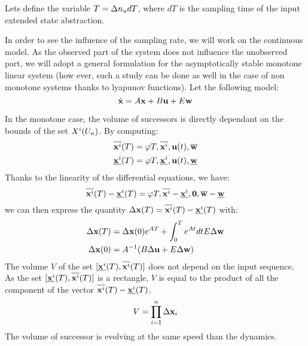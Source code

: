 \renewcommand{\dt}{dT}
Lets define the variable $T = \Ninputs\dt$, where $\dt$ is the sampling time of the input extended state abstraction.

In order to see the influence of the sampling rate, we will work on the continuous model. 
As the observed part of the system does not influence the unobserved part, we will adopt a general formulation for the asymptotically stable monotone linear system (how ever, such a study can be done as well in the case of non monotone systems thanks to lyapunov functions).
Let the following model:
\begin{equation}
\dot{ \mathbf{x}} = A  \mathbf{x} + B  \mathbf{u} + E  \mathbf{w}
\end{equation}

In the monotone case, the volume of successors is directly dependant on the bounds of the set $X^i(U_n)$.
By computing:
\newcommand{\xs}{\msup{\xunobs}}
\renewcommand{\xi}{\minf{\xunobs}}
\newcommand{\Dx}{\Delta \x}
\newcommand{\Du}{\Delta \u}
\newcommand{\Dw}{\Delta \w}
\begin{equation}
\begin{split}
\xs(T) &= \traj{T,\xs,\u(t),\msup{\w}} \\
\xi(T) &= \traj{T,\xi,\u(t),\minf{\w}} \\
\end{split}
\end{equation}
Thanks to the linearity of the differential equations, we have:
\begin{equation}
\overline{ \mathbf{x}^i}(T) - \underline{ \mathbf{x}^i}(T)
= \varphi{T,
\overline{\ensuremath{ \mathbf{x}}^i}- \underline{\ensuremath{ \mathbf{x}}^i}
,\ensuremath{ \mathbf{0}},
\overline{\ensuremath{ \mathbf{w}}} - \underline{\ensuremath{ \mathbf{w}}}
}
\end{equation}
we can then express the quantity $\Dx(T) = \msup{\xunobs}(T) - \minf{\xunobs}(T)$ with:
\begin{equation}\label{eq:vect_succ}
\begin{split}
\Dx(T) &= \Dx(0) \exp{A T} + \int_{0}^{T} \exp{A t} dt E \Dw \\
\Dx(0) &= A^{-1}(B \Du + E \Dw) \\
\end{split}
\end{equation}
The volume $V$ of the set $[\xi(T),\xs(T)]$ does not depend on the input sequence. As the set $[\xi(T),\xs(T)]$  is a rectangle, $V$ is equal to the product of all the component of the vector $\xs(T) - \xi(T)$.
\begin{equation}
V = \prod_{i=1}^{n} \Dx_i
\end{equation}
The volume of successor is evolving at the same speed than the dynamics.

